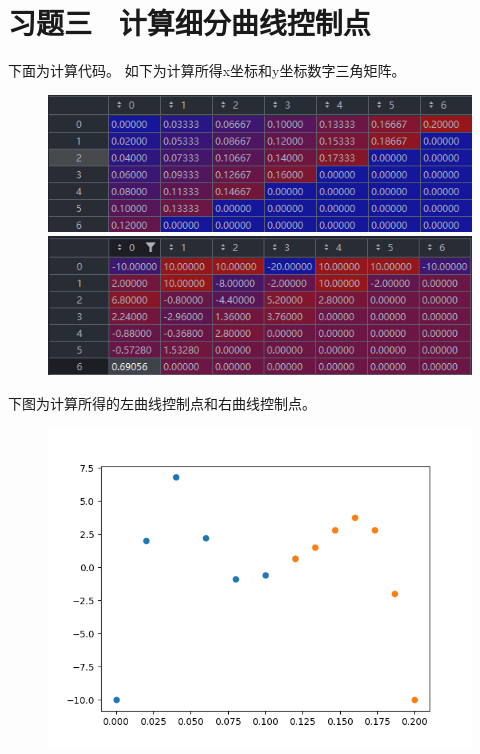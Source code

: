 \clearpage
\section{习题三 \ 计算细分曲线控制点}
下面为计算代码。
如下为计算所得x坐标和y坐标数字三角矩阵。
\begin{figure}[htbp]
    \centering
    \includegraphics[]{pic/datax.png}
    \includegraphics[]{pic/datay.png}
\end{figure}

下图为计算所得的左曲线控制点和右曲线控制点。

\begin{figure}[htbp]
    \centering
    \includegraphics[scale=0.5]{pic/controlpoints.png}
\end{figure}


